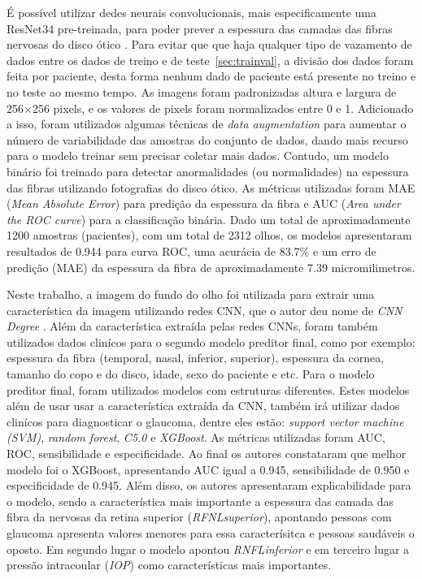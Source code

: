 \documentclass[ %
	msc, %
	portugues %
]{../ppgccufmg}
\begin{document}
    É possível utilizar dedes neurais convolucionais, mais especificamente  uma
    ResNet34 pre-treinada, para poder prever a espessura das camadas das fibras nervosas
    do disco ótico \citep{Medeiros2019-au}.
    Para evitar que que haja qualquer tipo de vazamento de dados entre os dados de treino e de
    teste~\ref{sec:trainval}, a divisão dos dados foram feita por paciente,
    desta forma nenhum dado de paciente está presente no treino e no
    teste ao mesmo tempo. As imagens foram padronizadas altura e largura de  256$\times$256 pixels,
    e os valores de pixels foram normalizados entre 0 e 1. Adicionado a isso,
    foram utilizados algumas técnicas de \textit{data
    augmentation} para aumentar o número de variabilidade das amostras do conjunto de dados, dando
    mais recurso para o modelo treinar sem precisar coletar mais dados. Contudo, um modelo
    binário foi treinado para detectar anormalidades (ou normalidades) na espessura das fibras
    utilizando fotografias do disco ótico. As métricas utilizadas foram MAE (\textit{Mean Absolute Error}) para predição da
    espessura da fibra e AUC (\textit{Area under the ROC curve}) para a classificação binária.
    Dado um total de aproximadamente 1200 amostras (pacientes), com um total de 2312 olhos,
    os modelos apresentaram resultados de 0.944 para curva ROC,  uma acurácia de 83.7\% e um erro de predição (MAE) da espessura da
    fibra de aproximadamente 7.39 micromilimetros.

    Neste trabalho, a imagem do fundo do olho foi utilizada para extrair uma característica da
    imagem utilizando redes CNN, que o autor deu nome de \textit{CNN Degree} \citep{diagnostics11030510}.
    Além da característica extraída pelas redes CNNs, foram também
    utilizados dados clinícos para o segundo modelo preditor final, como por exemplo: espessura da fibra
    (temporal, nasal, inferior, superior), espessura da cornea, tamanho do copo e do disco, idade,
    sexo do paciente e etc. Para o modelo preditor final, foram utilizados modelos com estruturas
    diferentes. Estes modelos além de usar usar a característica extraída da
    CNN, também irá utilizar dados clinícos para diagnosticar o glaucoma, dentre eles estão:
    \textit{support vector machine (SVM)}, \textit{random forest}, \textit{C5.0} e \textit{XGBoost}.
    As métricas utilizadas foram AUC, ROC, sensibilidade e especificidade. Ao final os autores
    constataram que melhor modelo foi o XGBoost, apresentando AUC igual a 0.945, sensibilidade de
    0.950 e especificidade de 0.945. Além disso, os autores apresentaram explicabilidade para o
    modelo, sendo a característica mais importante a espessura das camada das fibra da nervosas da retina
    superior (\textit{RFNLsuperior}), apontando pessoas com glaucoma apresenta valores menores para essa caracterísitca e pessoas
    saudáveis o oposto. Em segundo lugar o modelo apontou \textit{RNFLinferior} e em terceiro lugar
    a pressão intracoular (\textit{IOP}) como características mais importantes.
\end{document}
